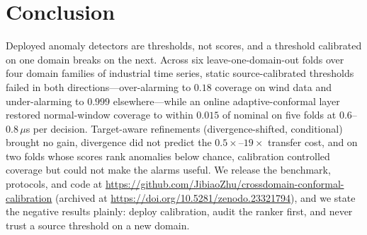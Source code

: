 \section{Conclusion}
\label{sec:conclusion}

Deployed anomaly detectors are thresholds, not scores, and a threshold calibrated on one domain breaks on the next. Across six leave-one-domain-out folds over four domain families of industrial time series, static source-calibrated thresholds failed in both directions---over-alarming to $0.18$ coverage on wind data and under-alarming to $0.999$ elsewhere---while an online adaptive-conformal layer restored normal-window coverage to within $0.015$ of nominal on five folds at $0.6$--$0.8\,\mu$s per decision. Target-aware refinements (divergence-shifted, conditional) brought no gain, divergence did not predict the $0.5\times$--$19\times$ transfer cost, and on two folds whose scores rank anomalies below chance, calibration controlled coverage but could not make the alarms useful. We release the benchmark, protocols, and code at \url{https://github.com/JibiaoZhu/crossdomain-conformal-calibration} (archived at \url{https://doi.org/10.5281/zenodo.23321794}), and we state the negative results plainly: deploy calibration, audit the ranker first, and never trust a source threshold on a new domain.
